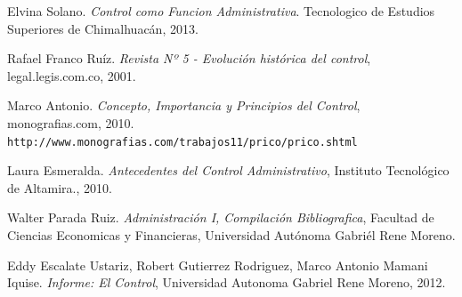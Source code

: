 \documentclass[12pt,letterpaper]{article}
\begin{document}
\newpage


\begin{thebibliography}{9}
Elvina Solano.
\textit{Control como Funcion Administrativa}. 
Tecnologico de Estudios Superiores de Chimalhuacán, 2013.
 
Rafael Franco Ruíz. \textit{Revista Nº 5 - Evolución histórica del control}, legal.legis.com.co, 2001.

 
Marco Antonio. \textit{Concepto, Importancia y Principios del Control}, monografias.com, 2010.
\\\texttt{http://www.monografias.com/trabajos11/prico/prico.shtml}

Laura Esmeralda. \textit{Antecedentes del Control  Administrativo}, Instituto Tecnológico de Altamira., 2010.

Walter Parada Ruiz. \textit{Administración I, Compilación Bibliografica}, Facultad de Ciencias Economicas y Financieras, Universidad Autónoma Gabriél Rene Moreno.

Eddy Escalate Ustariz, Robert Gutierrez Rodriguez, Marco Antonio Mamani Iquise. \textit{Informe: El Control}, Universidad Autonoma Gabriel Rene Moreno, 2012.
\end{thebibliography}
\end{document}

